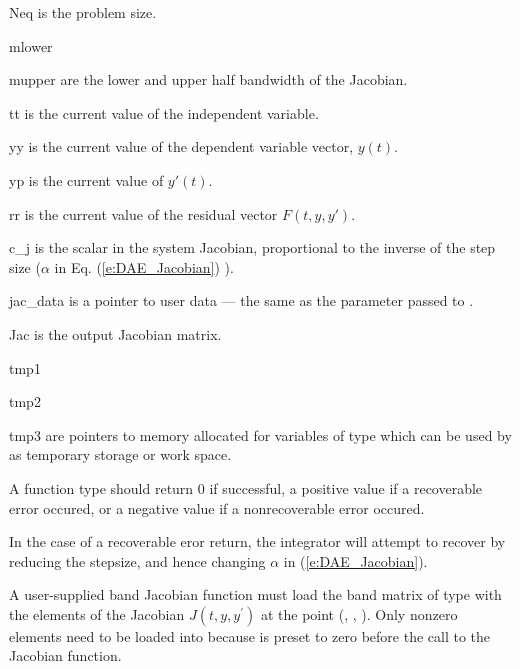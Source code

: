 {{}
{
  \begin{args}
  \item[Neq]
    is the problem size.
  \item[mlower]
  \item[mupper]
    are the lower and upper half bandwidth of the Jacobian.
  \item[tt]
    is the current value of the independent variable.
  \item[yy]
    is the current value of the dependent variable vector, $y(t)$.
  \item[yp]
    is the current value of $y'(t)$.
  \item[rr]
    is the current value of the residual vector $F(t,y,y')$.
  \item[c\_j]
    is the scalar in the system Jacobian, proportional to the inverse of the
    step size ($\alpha$ in Eq. (\ref{e:DAE_Jacobian}) ).
  \item[jac\_data]
    is a pointer to user data --- the same as the       
    parameter passed to .   
  \item[Jac]
    is the output Jacobian matrix.  
  \item[tmp1]
  \item[tmp2]
  \item[tmp3]
    are pointers to memory allocated for variables of type  
    which can be used by  as temporary storage or work space.    
  \end{args}
}
{
  A  function type should return $0$ if successful,
  a positive value if a recoverable error occured, or a negative value
  if a nonrecoverable error occured. 

  In the case of a recoverable eror return, 
  the integrator will attempt to recover by reducing the stepsize,
  and hence changing $\alpha$ in (\ref{e:DAE_Jacobian}).
}
{
  A user-supplied band Jacobian function must load the band matrix 
  of type  with the elements of the Jacobian $J(t,y,y^\prime)$ at the
  point (, , ).  Only nonzero elements need to be loaded into
   because  is preset to zero before the call to the
  Jacobian function.  

}}
